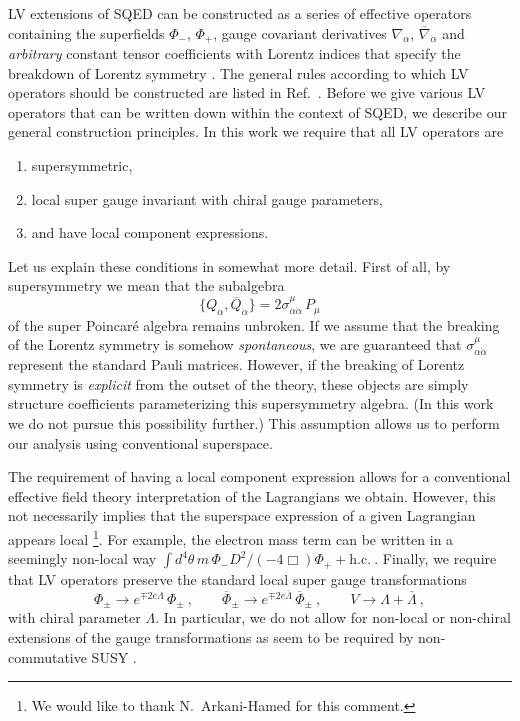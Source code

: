 \documentclass[12pt]{revtex4}
\begin{document}
LV extensions of SQED can be constructed as a series of effective
operators containing the superfields $\Phi_-$, $\Phi_+$,
gauge covariant derivatives $ \nabla_\alpha $, 
$ \overline{\nabla}_{\dot\alpha} $ and
%
{\em arbitrary} constant tensor coefficients with Lorentz indices 
that specify the
breakdown of Lorentz symmetry \cite{GrootNibbelink:2004za}. 
The general rules according to which LV operators should be
constructed are listed in Ref.\ \cite{MP:}. Before we give various
LV operators that can be written down within the context of SQED, we
describe our general construction principles. In this work we require
that all LV operators are  
\begin{enumerate}
\item supersymmetric, 
\item local super gauge invariant with chiral gauge parameters, 
\item and have local component expressions. 
\end{enumerate}
Let us explain these conditions in somewhat more detail. First of all,
by supersymmetry we mean that the subalgebra 
\begin{equation}
\{ Q_\alpha, \overline{Q}_{\dot\alpha} \} = 
2 \sigma^\mu_{\alpha\dot{\alpha}} \, P_\mu
\end{equation}
of the super Poincar\'e algebra remains unbroken. If we assume that 
the breaking of the Lorentz symmetry is somehow 
{\em spontaneous}, we are guaranteed that
$\sigma^\mu_{\alpha\dot{\alpha}}$ represent the standard Pauli
matrices. However, if the breaking of Lorentz symmetry is {\em
explicit} from the outset of the theory, these objects are simply 
structure coefficients parameterizing this supersymmetry algebra. (In
this work we do not pursue this possibility further.) This assumption
allows us to perform our analysis using conventional superspace. 


The requirement of having a local component expression allows for a
conventional effective field theory interpretation of the Lagrangians
we obtain. However, this not necessarily implies that the superspace
expression of a given Lagrangian appears local \footnote{We would 
like to thank N.\ Arkani-Hamed for this comment.}. For example, the
electron mass term can be written in a seemingly non-local way  
\(
\int d^4 \theta\, m \, \Phi_- D^2/(- 4\Box) \Phi_+ + \text{h.c.}~.
\)
%
Finally, we require that LV operators preserve the standard local
super gauge transformations  
\begin{equation}
\Phi_\pm \rightarrow e^{\mp 2 e \Lambda} \, \Phi_\pm~, 
\qquad 
\overline{\Phi}_\pm \rightarrow e^{\mp 2 e \overline{\Lambda}} \, 
\overline{\Phi}_\pm~, 
\qquad 
V \rightarrow \Lambda + \overline{\Lambda}~, 
\label{Gauge}
\end{equation} 
with chiral parameter $\Lambda$. In particular, we do not allow for
non-local or non-chiral extensions of the gauge transformations as
seem to be required by non-commutative SUSY
\cite{Putz:2002ib,Mikulovic:2003sq}.  
\end{document}
